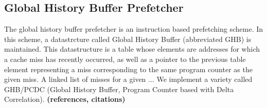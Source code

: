 \subsection{Global History Buffer Prefetcher}
\label{sec:ghbPcdcPrefetcher}

The global history buffer prefetcher is an instruction based
prefetching scheme. In this scheme, a datastrcture called Global
History Buffer (abbreviated GHB) is maintained. This datastructure is
a table whose elements are addresses for which a cache miss has
recently occurred, as well as a pointer to the previous table element
representing a miss corresponding to the same program counter as the
given miss. A linked list of misses for a given ... We implement a
variety called GHB/PCDC (Global History Buffer, Program Counter based
with Delta Correlation).  {\bf (references, citations)}